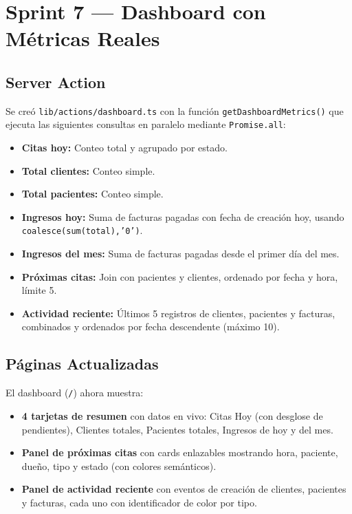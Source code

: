 \documentclass[12pt,a4paper]{article}
\begin{document}
\section{Sprint 7 --- Dashboard con Métricas Reales}

\subsection{Server Action}

Se creó \texttt{lib/actions/dashboard.ts} con la función
\texttt{getDashboardMetrics()} que ejecuta las siguientes consultas en
paralelo mediante \texttt{Promise.all}:

\begin{itemize}[leftmargin=*]
    \item \textbf{Citas hoy:} Conteo total y agrupado por estado.
    \item \textbf{Total clientes:} Conteo simple.
    \item \textbf{Total pacientes:} Conteo simple.
    \item \textbf{Ingresos hoy:} Suma de facturas pagadas con fecha de creación
          hoy, usando \texttt{coalesce(sum(total),'0')}.
    \item \textbf{Ingresos del mes:} Suma de facturas pagadas desde el primer
          día del mes.
    \item \textbf{Próximas citas:} Join con pacientes y clientes, ordenado por
          fecha y hora, límite 5.
    \item \textbf{Actividad reciente:} Últimos 5 registros de clientes, pacientes
          y facturas, combinados y ordenados por fecha descendente (máximo 10).
\end{itemize}

\subsection{Páginas Actualizadas}

El dashboard (\texttt{/}) ahora muestra:

\begin{itemize}[leftmargin=*]
    \item \textbf{4 tarjetas de resumen} con datos en vivo: Citas Hoy (con
          desglose de pendientes), Clientes totales, Pacientes totales,
          Ingresos de hoy y del mes.
    \item \textbf{Panel de próximas citas} con cards enlazables mostrando hora,
          paciente, dueño, tipo y estado (con colores semánticos).
    \item \textbf{Panel de actividad reciente} con eventos de creación de
          clientes, pacientes y facturas, cada uno con identificador de color
          por tipo.
\end{itemize}
\end{document}
